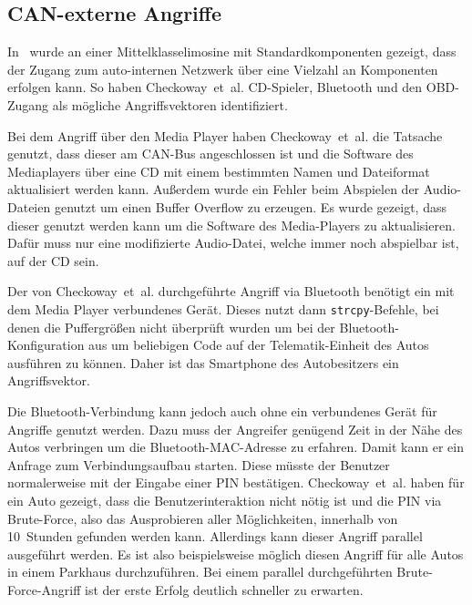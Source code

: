 \subsection{CAN-externe Angriffe}\label{subsec:can-extern-attackers}
In~\cite{Checkoway2011} wurde an einer Mittel\-klasse\-limosine mit
Standard\-komponenten gezeigt, dass der Zugang zum auto-internen Netzwerk über
eine Vielzahl an Komponenten erfolgen kann. So haben Checkoway~et~al.
CD-Spieler, Bluetooth und den OBD-Zugang als mögliche Angriffs\-vektoren
identifiziert.

Bei dem Angriff über den Media Player haben Checkoway~et~al. die Tatsache
genutzt, dass dieser am CAN-Bus angeschlossen ist und die Software des
Mediaplayers über eine CD mit einem bestimmten Namen und Dateiformat
aktualisiert werden kann. Außerdem wurde ein Fehler beim Abspielen der
Audio-Dateien genutzt um einen Buffer Overflow zu erzeugen. Es wurde gezeigt,
dass dieser genutzt werden kann um die Software des Media-Players zu
aktualisieren. Dafür muss nur eine modifizierte Audio-Datei, welche immer noch
abspielbar ist, auf der CD sein.

% 
%
% 
%

Der von Checkoway~et~al. durchgeführte Angriff via Bluetooth benötigt ein
mit dem Media Player verbundenes Gerät. Dieses nutzt dann
\verb+strcpy+-Befehle, bei denen die Puffergrößen nicht überprüft wurden um bei
der Bluetooth-Konfiguration aus um beliebigen Code auf der Telematik-Einheit
des Autos ausführen zu können. Daher ist das Smartphone des Autobesitzers ein
Angriffsvektor.

Die Bluetooth-Verbindung kann jedoch auch ohne ein verbundenes Gerät für
Angriffe genutzt werden. Dazu muss der Angreifer genügend Zeit in der Nähe des
Autos verbringen um die Bluetooth-MAC-Adresse zu erfahren. Damit kann er ein
Anfrage zum Verbindungsaufbau starten. Diese müsste der Benutzer normalerweise
mit der Eingabe einer PIN bestätigen. Checkoway~et~al. haben für ein Auto
gezeigt, dass die Benutzerinteraktion nicht nötig ist und die PIN via
Brute-Force, also das Ausprobieren aller Möglichkeiten, innerhalb von
10~Stunden gefunden werden kann. Allerdings kann dieser Angriff parallel
ausgeführt werden. Es ist also beispielsweise möglich diesen Angriff für alle
Autos in einem Parkhaus durchzuführen. Bei einem parallel durchgeführten
Brute-Force-Angriff ist der erste Erfolg deutlich schneller zu erwarten.

